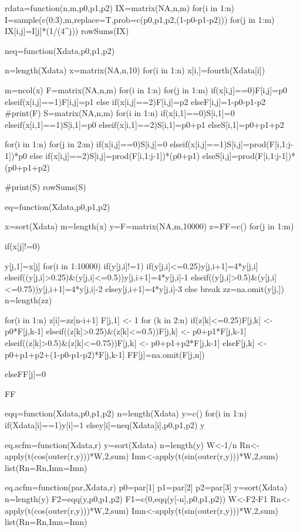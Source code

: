 rdata=function(n,m,p0,p1,p2){
IX=matrix(NA,n,m)
for(i in 1:n){
I=sample(c(0:3),m,replace=T,prob=c(p0,p1,p2,(1-p0-p1-p2)))
for(j in 1:m){
IX[i,j]=I[j]*(1/(4^j))
}
}
rowSums(IX)
}

neq=function(Xdata,p0,p1,p2){
n=length(Xdata)
x=matrix(NA,n,10)
for(i in 1:n)
{
x[i,]=fourth(Xdata[i])
}

m=ncol(x)
F=matrix(NA,n,m)
for(i in 1:n)
{
for(j in 1:m)
{
if(x[i,j]==0){F[i,j]=p0}
  else{if(x[i,j]==1){F[i,j]=p1}
   else {if(x[i,j]==2){F[i,j]=p2}
        else{F[i,j]=1-p0-p1-p2
  }
}
}
}
}
#print(F)
S=matrix(NA,n,m)
for(i in 1:n)
{
if(x[i,1]==0){S[i,1]=0}
    else{if(x[i,1]==1){S[i,1]=p0}
    else{if(x[i,1]==2){S[i,1]=p0+p1} 
      else{S[i,1]=p0+p1+p2}
}
}
}

for(i in 1:n)
{
for(j in 2:m)
{
if(x[i,j]==0){S[i,j]=0}
   else{if(x[i,j]==1){S[i,j]=prod(F[i,1:j-1])*p0}
   else {if(x[i,j]==2){S[i,j]=prod(F[i,1:j-1])*(p0+p1)}
    else{S[i,j]=prod(F[i,1:j-1])*(p0+p1+p2)}
}
}
}
}

#print(S)
rowSums(S)
}


eq=function(Xdata,p0,p1,p2){
x=sort(Xdata)
m=length(x)
y=F=matrix(NA,m,10000)
z=FF=c()
for(j in 1:m)
{
if(x[j]!=0){
y[j,1]=x[j]
for(i in 1:10000){
if(y[j,i]!=1){
if(y[j,i]<=0.25){y[j,i+1]=4*y[j,i]}
else{if((y[j,i]>0.25)&(y[j,i]<=0.5)){y[j,i+1]=4*y[j,i]-1}
     else{if((y[j,i]>0.5)&(y[j,i]<=0.75)){y[j,i+1]=4*y[j,i]-2}
          else{y[j,i+1]=4*y[j,i]-3
}
}
}
}
else{
break
}
}
zz=na.omit(y[j,])
n=length(zz)

for(i in 1:n){
  z[i]=zz[n-i+1]
    }
F[j,1] <- 1
for (k in 2:n) {
if(z[k]<=0.25){F[j,k] <- p0*F[j,k-1]}
else{if((z[k]>0.25)&(z[k]<=0.5)){F[j,k] <- p0+p1*F[j,k-1]}
     else{if((z[k]>0.5)&(z[k]<=0.75)){F[j,k] <- p0+p1+p2*F[j,k-1]}
          else{F[j,k] <-p0+p1+p2+(1-p0-p1-p2)*F[j,k-1]
}
}
}
}
FF[j]=na.omit(F[j,n])
}
else{FF[j]=0}
}
FF
}

eqq=function(Xdata,p0,p1,p2){
n=length(Xdata)
y=c()
for(i in 1:n)
{
if(Xdata[i]==1){y[i]=1}
else{y[i]=neq(Xdata[i],p0,p1,p2)
}
}
y
}

eq.scfm=function(Xdata,r){
   y=sort(Xdata)
   n=length(y)
   W<-1/n
   Rn<-apply(t(cos(outer(r,y)))*W,2,sum)
   Imn<-apply(t(sin(outer(r,y)))*W,2,sum)
   list(Rn=Rn,Imn=Imn)
}

eq.acfm=function(par,Xdata,r){
    p0=par[1]
    p1=par[2]
    p2=par[3]
   y=sort(Xdata)
   n=length(y)
   F2=eqq(y,p0,p1,p2)
   F1=c(0,eqq(y[-n],p0,p1,p2))
   W<-F2-F1
   Rn<-apply(t(cos(outer(r,y)))*W,2,sum)
   Imn<-apply(t(sin(outer(r,y)))*W,2,sum)
   list(Rn=Rn,Imn=Imn)
}

